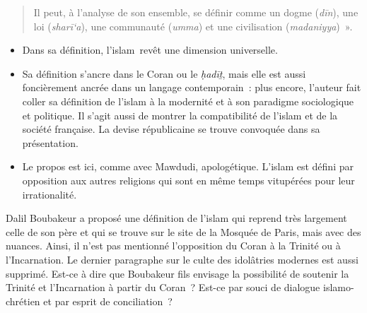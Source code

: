\begin{quote}
Il peut, à l'analyse de son ensemble, se définir comme un dogme
(\emph{dīn}), une loi (\emph{sharī`a}), une communauté (\emph{umma}) et
une civilisation (\emph{madaniyya})~».
\end{quote}

\begin{itemize}
\item
  Dans sa définition, l'islam~revêt une dimension universelle.
\item
  Sa définition s'ancre dans le Coran ou le \emph{ḥadīṯ}, mais elle est
  aussi foncièrement ancrée dans un langage contemporain~: plus encore,
  l'auteur fait coller sa définition de l'islam à la modernité et à son
  paradigme sociologique et politique. Il s'agit aussi de montrer la
  compatibilité de l'islam et de la société française. La devise
  républicaine se trouve convoquée dans sa présentation.
\item
  Le propos est ici, comme avec Mawdudi, apologétique. L'islam est
  défini par opposition aux autres religions qui sont en même temps
  vitupérées pour leur irrationalité.
\end{itemize}

Dalil Boubakeur a proposé une définition de l'islam qui reprend très
largement celle de son père et qui se trouve sur le site de la Mosquée
de Paris, mais avec des nuances. Ainsi, il n'est pas mentionné l'opposition du Coran à
la Trinité ou à l'Incarnation. Le dernier paragraphe sur le culte des
idolâtries modernes est aussi supprimé. Est-ce à dire que Boubakeur fils
envisage la possibilité de soutenir la Trinité et l'Incarnation à partir
du Coran~? Est-ce par souci de dialogue islamo-chrétien et par esprit de
conciliation~?


